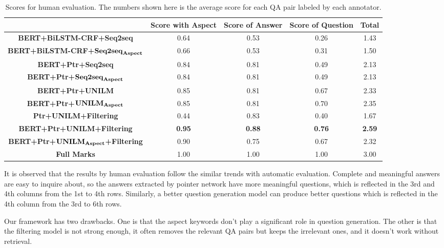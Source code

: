 \begin{table*}[th]
\scriptsize
\centering
\begin{tabular}{ccccc}
\toprule[1.5pt]
\textbf{} & \textbf{Score with Aspect} & \textbf{Score of Answer} & \textbf{Score of Question} & \textbf{Total} \\
\midrule
\textbf{BERT+BiLSTM-CRF+Seq2seq}&0.64  &  0.53  &  0.26  &  1.43  \\
\textbf{BERT+BiLSTM-CRF+}$\text{\textbf{Seq2seq}}_{\text{\textbf{Aspect}}}$& 0.66  &  0.53  &  0.31  &  1.50  \\
\textbf{BERT+Ptr+Seq2seq}& 0.84  &  0.81  &  0.49  &  2.13 \\
\textbf{BERT+Ptr+}$\text{\textbf{Seq2seq}}_{\text{\textbf{Aspect}}}$& 0.84  &  0.81  &  0.49  &  2.13  \\
\textbf{BERT+Ptr+UNILM}& 0.85  &  0.81  &  0.67  &  2.33  \\
\textbf{BERT+Ptr+}$\text{\textbf{UNILM}}_{\text{\textbf{Aspect}}}$& 0.85  &  0.81  &  0.70  &  2.35  \\
\midrule
\textbf{Ptr+UNILM+Filtering}& 0.44  &  0.83  &  0.40  &  1.67\\
\midrule
\textbf{BERT+Ptr+UNILM+Filtering}&\textbf{0.95}  & \textbf{0.88} &  \textbf{0.76} &  \textbf{2.59}  \\
\textbf{BERT+Ptr+}$\text{\textbf{UNILM}}_{\text{\textbf{Aspect}}}$\textbf{+Filtering}& 0.90  &  0.75  &  0.67  &  2.32  \\
\midrule
 \textbf{Full Marks} & 1.00 & 1.00 & 1.00 & 3.00 \\
\bottomrule[1.5pt]
\end{tabular}
\caption{\label{tab:humaneval} Scores for human evaluation. The numbers shown here is the average score for each QA pair labeled by each annotator. 
}
\end{table*}

It is observed that the results by human evaluation follow the similar trends with automatic evaluation.
Complete and meaningful answers are easy to inquire about, so the answers extracted by pointer network have more meaningful questions, which is reflected in the 3rd and 4th columns from the 1st to 4th rows. 
Similarly, a better question generation model can produce better questions which is reflected in the 4th column from the 3rd to 6th rows. 

Our framework has two drawbacks.
One is that the aspect keywords don't play a significant role in question generation.
The other is that the filtering model is not strong enough, it often removes the relevant QA pairs but keeps the irrelevant ones, and it doesn't work without retrieval.


